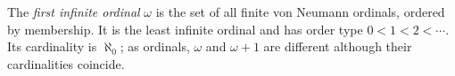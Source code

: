 
The \emph{first infinite ordinal} $\omega$ is the set of all finite von Neumann ordinals, ordered by membership. It is the least infinite ordinal and has order type $0<1<2<\cdots$. Its cardinality is $\aleph_0$; as ordinals, $\omega$ and $\omega+1$ are different although their cardinalities coincide.
